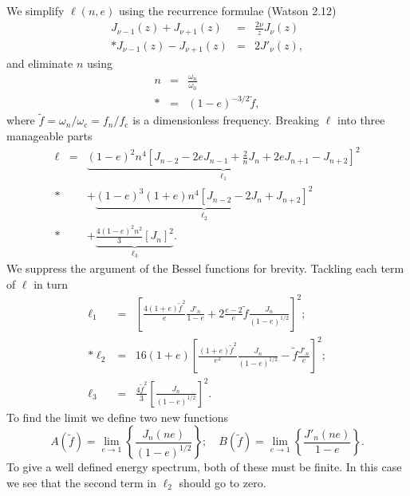 \documentclass[aps,prd,reprint,showpacs,groupedaddress]{revtex4-1}
\newcommand{\sub}[1]{\ensuremath{_\text{#1}}}
\begin{document}
We simplify $\ell(n,e)$ using the recurrence formulae (Watson\cite{Watson1995} 2.12)
\begin{eqnarray}
J_{\nu-1}(z) + J_{\nu+1}(z) & = & \frac{2\nu}{z}J_\nu(z)\\*
J_{\nu-1}(z) - J_{\nu+1}(z) & = & 2J'_\nu(z),
\end{eqnarray}
and eliminate $n$ using
\begin{eqnarray}
n & = & \frac{\omega_n}{\omega_0} \nonumber \\*
& = & (1-e)^{-3/2}\tilde{f},
\end{eqnarray}
where $\tilde{f} = \omega_n/\omega\sub{c} = f_n/f\sub{c}$ is a dimensionless frequency. Breaking $\ell$ into three manageable parts
\begin{eqnarray}
\ell & = & \underbrace{(1-e)^2n^4\left[J_{n-2} - 2eJ_{n-1} + \frac{2}{n}J_n + 2eJ_{n+1} - J_{n+2}\right]^2}_{\ell_1} \nonumber \\*
 & & + \underbrace{(1-e)^3(1+e)n^4\left[J_{n-2} - 2J_n + J_{n+2}\right]^2}_{\ell_2} \nonumber \\*
 & & + \underbrace{\frac{4(1-e)^2n^2}{3}\left[J_n\right]^2}_{\ell_3}.
\end{eqnarray}
We suppress the argument of the Bessel functions for brevity. Tackling each term of $\ell$ in turn
\begin{eqnarray}
\ell_1 & = & \left[\frac{4(1+e)\tilde{f}^2}{e}\frac{J'_n}{1-e} + 2\frac{e-2}{e}\tilde{f}\frac{J_n}{(1-e)^{1/2}}\right]^2;\\*
\ell_2 & = & 16(1+e)\left[\frac{(1+e)\tilde{f}^2}{e^2}\frac{J_n}{(1-e)^{1/2}} - \tilde{f}\frac{J'_n}{e}\right]^2;\\
\ell_3 & = & \frac{4\tilde{f}^2}{3}\left[\frac{J_n}{(1-e)^{1/2}}\right]^2.
\end{eqnarray}
To find the limit we define two new functions
\begin{equation}
A(\tilde{f}) = \lim_{e\rightarrow 1}\left\{\frac{J_n(ne)}{(1-e)^{1/2}}\right\}; \quad B(\tilde{f}) = \lim_{e\rightarrow 1}\left\{\frac{J'_n(ne)}{1-e}\right\}.
\end{equation}
To give a well defined energy spectrum, both of these must be finite. In this case we see that the second term in $\ell_2$ should go to zero.
\end{document}
